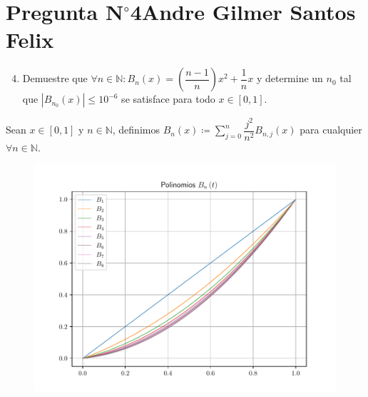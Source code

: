 \section{Pregunta N$^{\circ}$4\qquad Andre Gilmer Santos Felix}



\begin{frame}
	\begin{enumerate}\setcounter{enumi}{3}
		\item

		      Demuestre que
		      \begin{math}
			      \forall n\in\mathbb{N}:
			      B_{n}\left(x\right)=
			      \left(\dfrac{n-1}{n}\right)x^{2}+
			      \dfrac{1}{n}x
		      \end{math}
		      y determine un $n_{0}$ tal que
		      \begin{math}
			      \left|
			      B_{n_{0}}\left(x\right)
			      \right|\leq
			      10^{-6}
		      \end{math}
		      se satisface para todo $x\in\left[0,1\right]$.
	\end{enumerate}

	\begin{solution}
		Sean $x\in\left[0,1\right]$ y $n\in\mathbb{N}$, definimos
		\begin{math}
			B_{n}\left(x\right)\coloneqq
			\sum\limits_{j=0}^{n}
			\dfrac{j^{2}}{n^{2}}
			B_{n,j}\left(x\right)
		\end{math}
		para cualquier
		\begin{math}
			\forall n\in\mathbb{N}
		\end{math}.

		\begin{figure}[ht!]
			\centering
			\includegraphics[width=.5\paperwidth]{b_n}
		\end{figure}
	\end{solution}
\end{frame}

